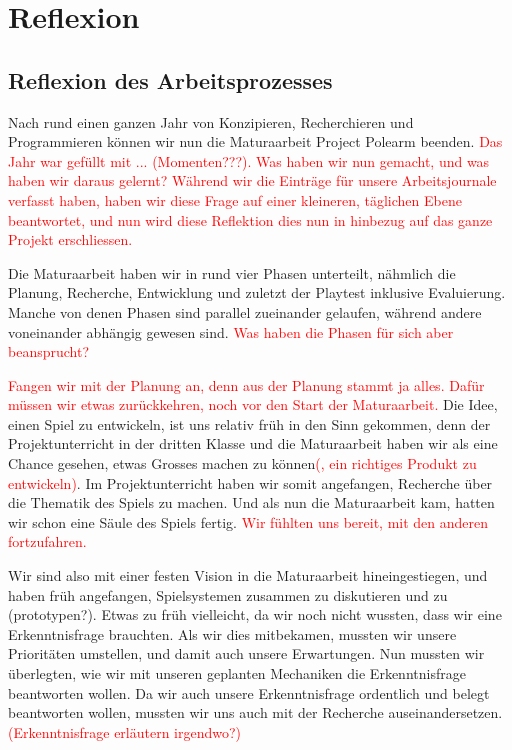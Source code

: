 \documentclass[../Main.tex]{subfiles}
\begin{document}
\section{Reflexion} \label{sec:Reflexion}

\subsection{Reflexion des Arbeitsprozesses}

Nach rund einen ganzen Jahr von Konzipieren, Recherchieren und Programmieren können wir nun die Maturaarbeit Project Polearm beenden. \textcolor{red}{Das Jahr war gefüllt mit ... (Momenten???). Was haben wir nun gemacht, und was haben wir daraus gelernt? Während wir die Einträge für unsere Arbeitsjournale verfasst haben, haben wir diese Frage auf einer kleineren, täglichen Ebene beantwortet, und nun wird diese Reflektion dies nun in hinbezug auf das ganze Projekt erschliessen.}

Die Maturaarbeit haben wir in rund vier Phasen unterteilt, nähmlich die Planung, Recherche, Entwicklung und zuletzt der Playtest inklusive Evaluierung. Manche von denen Phasen sind parallel zueinander gelaufen, während andere voneinander abhängig gewesen sind. \textcolor{red}{Was haben die Phasen für sich aber beansprucht?}

\textcolor{red}{Fangen wir mit der Planung an, denn aus der Planung stammt ja alles. Dafür müssen wir etwas zurückkehren, noch vor den Start der Maturaarbeit.} Die Idee, einen Spiel zu entwickeln, ist uns relativ früh in den Sinn gekommen, denn der Projektunterricht in der dritten Klasse und die Maturaarbeit haben wir als eine Chance gesehen, etwas Grosses machen zu können\textcolor{red}{(, ein richtiges Produkt zu entwickeln)}. Im Projektunterricht haben wir somit angefangen, Recherche über die Thematik des Spiels zu machen. Und als nun die Maturaarbeit kam, hatten wir schon eine Säule des Spiels fertig. \textcolor{red}{Wir fühlten uns bereit, mit den anderen fortzufahren.}

Wir sind also mit einer festen Vision in die Maturaarbeit hineingestiegen, und haben früh angefangen, Spielsystemen zusammen zu diskutieren und zu (prototypen?). Etwas zu früh vielleicht, da wir noch nicht wussten, dass wir eine Erkenntnisfrage brauchten. Als wir dies mitbekamen, mussten wir unsere Prioritäten umstellen, und damit auch unsere Erwartungen. Nun mussten wir überlegten, wie wir mit unseren geplanten Mechaniken die Erkenntnisfrage beantworten wollen.  Da wir auch unsere Erkenntnisfrage ordentlich und belegt beantworten wollen, mussten wir uns auch mit der Recherche auseinandersetzen. \textcolor{red}{(Erkenntnisfrage erläutern irgendwo?)}
\end{document}

